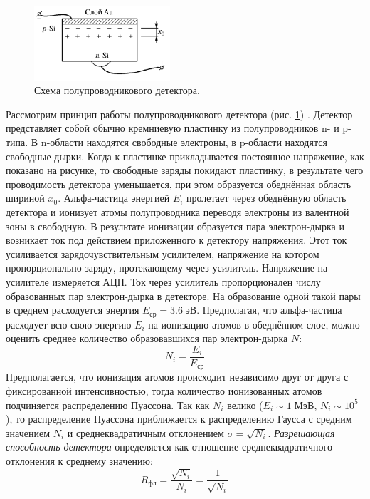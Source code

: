 \documentclass[10pt,a4paper]{article}
\newcommand{\MeV}[1][\;]{#1 МэВ}
\newcommand{\eV}[1][\;]{#1 эВ}
\begin{document}
\begin{multicols}{2}
	\begin{figure}[H]
		\centering
		\includegraphics[width=0.45\textwidth]{images/detector.png}
		\caption{Схема полупроводникового детектора.}
		\label{img:detector}
	\end{figure}

	Рассмотрим принцип работы полупроводникового детектора (рис. \ref{img:detector}) \cite[с. 464-468]{labnik}. Детектор представляет собой обычно кремниевую пластинку из полупроводников n- и p-типа. В n-области находятся свободные электроны, в p-области находятся свободные дырки. Когда к пластинке прикладывается постоянное напряжение, как показано на рисунке, то свободные заряды покидают пластинку, в результате чего проводимость детектора уменьшается, при этом образуется обеднённая область шириной $x_0$. Альфа-частица энергией $E_i$ пролетает через обеднённую область детектора и ионизует атомы полупроводника переводя электроны из валентной зоны в свободную. В результате ионизации образуется пара электрон-дырка и возникает ток под действием приложенного к детектору напряжения. Этот ток усиливается зарядочувствительным усилителем, напряжение на котором пропорционально заряду, протекающему через усилитель. Напряжение на усилителе измеряется АЦП. Ток через усилитель пропорционален числу образованных пар электрон-дырка в детекторе. На образование одной такой пары в среднем расходуется энергия $E_{ср} = 3.6 \eV$. Предполагая, что альфа-частица расходует всю свою энергию $E_i$ на ионизацию атомов в обеднённом слое, можно оценить среднее количество образовавшихся пар электрон-дырка $N$:
	$$
	N_i = \frac{E_i}{E_{ср}}
	$$
	Предполагается, что ионизация атомов происходит независимо друг от друга с фиксированной интенсивностью, тогда количество ионизованных атомов подчиняется распределению Пуассона. Так как $N_i$ велико ($E_i \sim 1 \MeV$, $N_i \sim 10^5$), то распределение Пуассона приближается к распределению Гаусса с средним значением $N_i$ и среднеквадратичным отклонением $\sigma = \sqrt{N_i}$. \textit{Разрешающая способность детектора} определяется как отношение среднеквадратичного отклонения к среднему значению:
	$$
	R_{фл} = \frac{\sqrt{N_i}}{N_i} = \frac{1}{\sqrt{N_i}}
	$$
	

\end{multicols}
\end{document}
